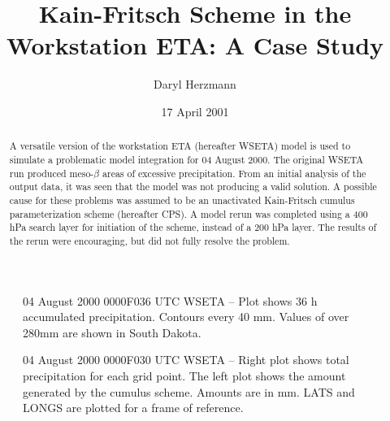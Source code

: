 \documentclass{article}
\title{Kain-Fritsch Scheme in the Workstation ETA: A Case Study}
\author{Daryl Herzmann}
\date{17 April 2001}
\begin{document}
\maketitle

\begin{abstract}
A versatile version of the workstation ETA (hereafter WSETA) model is used to simulate a problematic model integration for 04 August 2000.  The original WSETA run produced meso-$\beta$ areas of excessive precipitation.  From an initial analysis of the output data, it was seen that the model was not producing a valid solution.  A possible cause for these problems was assumed to be an unactivated Kain-Fritsch cumulus parameterization scheme (hereafter CPS).  A model rerun was completed using a 400 hPa search layer for initiation of the scheme, instead of a 200 hPa layer.  The results of the rerun were encouraging, but did not fully resolve the problem.

\end{abstract}

\Line

%
\begin{figure*}[bt]
\begin{center}
\end{center}
\label{firstPrec}
 \caption{04 August 2000 0000F036 UTC WSETA -- Plot shows 36 h accumulated precipitation.  Contours every 40 mm. Values of over 280mm are shown in South Dakota.}
\end{figure*}

\begin{figure*}[t]
\begin{center}
\begin{minipage}{.45\textwidth}
\end{minipage}
\hspace{14pt}
\begin{minipage}{.45\textwidth}
\end{minipage}
\end{center}
\caption{04 August 2000 0000F030 UTC WSETA -- Right plot shows total precipitation for each grid point. 
        The left plot shows the amount generated by the cumulus scheme.  Amounts are in mm.  LATS and LONGS are plotted for a frame
 of reference.}
\end{figure*}
\end{document}
